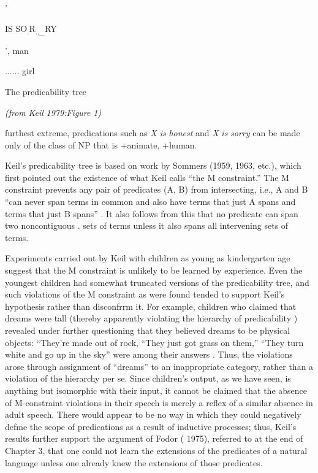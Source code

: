 '

IS SO\textsubscript{.}R\textsubscript{.,}\textsubscript{\_}RY

', man 

...... girl

The predicability tree

\textit{(from} \textit{Keil} \textit{1979:Figure} \textit{1)}


furthest extreme, predications such as \textit{X is} \textit{honest} and \textit{X} \textit{is} \textit{sorry} can be made only of the class of NP that is +animate, +human.

Keil's predicability tree is based on work by Sommers (1959, 1963, etc.), which first pointed out the existence of what Keil calls ``the M constraint.'' The M constraint prevents any pair of predicates (A, B) from intersecting, i.e., A and B ``can never span terms in com\-mon and also have terms that just A spans and terms that just B spans'' \citep[16]{Keil1979}. It also follows from this that no predicate can span two noncontiguous . sets of terms unless it also spans all intervening sets of terms.

Experiments carried out by Keil with children as young as kindergarten age suggest that the M constraint is unlikely to be learned by experience. Even the youngest children had somewhat truncated versions of the predicability tree, and such violations of the M con\-straint as were found tended to support Keil's hypothesis rather than disconfrrm it. For example, children who claimed that dreams were tall (thereby apparently violating the hierarchy of predicability ) re\-vealed under further questioning that they believed dreams to be physical objects: ``They're made out of rock,{\textquotedbl} ``They just got grass on them,'' ``They turn white and go up in the sky'' were among their answers \citep[110]{Keil1979}. Thus, the violations arose through assignment of ``dreams'' to an inappropriate category, rather than a violation of the hierarchy per se. Since children's output, as we have seen, is any\-thing but isomorphic with their input, it cannot be claimed that the absence of M-constraint violations in their speech is merely a reflex of a similar absence in adult speech. There would appear to be no way in which they could negatively defme the scope of predications as a result of inductive processes; thus, Keil's results further support the argument of Fodor ( 1975), referred to at the end of Chapter 3, that one could not learn the extensions of the predicates of a natural lan\-guage unless one already knew the extensions of those predicates.

